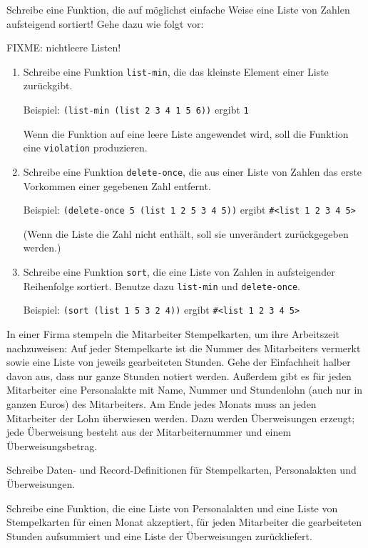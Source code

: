 \begin{aufgabe}
   Schreibe eine Funktion, die auf möglichst
  einfache Weise eine Liste von Zahlen aufsteigend sortiert! Gehe
  dazu wie folgt vor:

  FIXME: nichtleere Listen!
  
  \begin{enumerate}
  \item Schreibe eine Funktion
    \texttt{list-min}, die das kleinste Element einer
    Liste zurückgibt.

    Beispiel: \verb|(list-min (list 2 3 4 1 5 6))| ergibt \verb|1|

    Wenn die Funktion auf eine leere Liste angewendet
    wird, soll die Funktion eine \texttt{violation} produzieren.
  \item Schreibe eine Funktion
    \texttt{delete-once}, die aus einer Liste von Zahlen das erste
    Vorkommen einer gegebenen Zahl entfernt.

    Beispiel: \verb|(delete-once 5 (list 1 2 5 3 4 5))| ergibt
    \verb|#<list 1 2 3 4 5>|
    
    (Wenn die Liste die Zahl nicht enthält,
    soll sie unverändert zurückgegeben werden.)
  \item  Schreibe eine Funktion \texttt{sort}, die
    eine Liste von Zahlen in aufsteigender Reihenfolge sortiert.
    Benutze dazu \texttt{list-min} und \texttt{delete-once}.

    Beispiel: \verb|(sort (list 1 5 3 2 4))| ergibt
    \verb|#<list 1 2 3 4 5>|

  \end{enumerate}
\end{aufgabe}

\begin{aufgabe}
   In einer Firma stempeln die Mitarbeiter Stempelkarten, um ihre
  Arbeitszeit nachzuweisen: Auf jeder Stempelkarte ist die Nummer des
  Mitarbeiters vermerkt sowie eine Liste von jeweils gearbeiteten
  Stunden. Gehe der Einfachheit halber davon aus, dass nur ganze Stunden
  notiert werden.
  Außerdem gibt es für jeden Mitarbeiter eine Personalakte
  mit Name, Nummer und Stundenlohn (auch nur in ganzen Euros) des Mitarbeiters.
  Am Ende jedes Monats 
  muss an jeden Mitarbeiter der Lohn überwiesen werden.  Dazu werden
  Überweisungen erzeugt; jede Überweisung besteht aus der
  Mitarbeiternummer und einem Überweisungsbetrag.

  Schreibe Daten- und Record-Definitionen für Stempelkarten,
  Personalakten und Überweisungen.

  Schreibe eine Funktion, die eine Liste von Personalakten
  und eine Liste von Stempelkarten für einen Monat akzeptiert, für jeden
  Mitarbeiter die gearbeiteten Stunden aufsummiert und eine
  Liste der Überweisungen zurückliefert.
\end{aufgabe}

